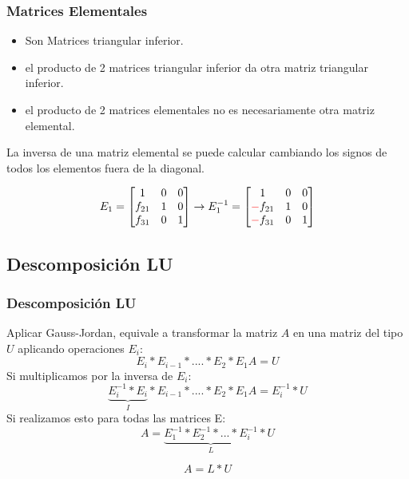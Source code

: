 \documentclass[xcolor=svgnames]{beamer} %
\theoremstyle{plain}
\theoremstyle{definition}
\begin{document}
\begin{frame}
\frametitle{Matrices Elementales}

\begin{itemize}
\item Son Matrices triangular inferior.
\item el producto de 2 matrices triangular inferior da otra matriz triangular inferior.
\item el producto de 2 matrices elementales no es necesariamente otra matriz elemental.
\end{itemize}
La inversa de una matriz elemental se puede calcular cambiando los signos de todos los elementos fuera de la diagonal.

$$ E_1 = \begin{bmatrix}
1 &0 & 0\\
f_{21}& 1 &0 \\
f_{31}& 0 &1 
\end{bmatrix} \rightarrow E_1^{-1} = \begin{bmatrix}
1 &0 & 0\\
{\color{red} -} f_{21}& 1 &0 \\
{\color{red} -} f_{31}& 0 &1 
\end{bmatrix}$$
\end{frame}

\subsection{Descomposición LU}
\begin{frame}
\frametitle{Descomposición LU}
Aplicar Gauss-Jordan, equivale a transformar la matriz $A$ en una matriz del tipo $U$ aplicando operaciones $E_i$:
$$ E_i * E_{i-1}* ....* E_2 * E_1 A = U $$
Si multiplicamos por la inversa de $E_i$:
$$ \underbrace{E_i^{-1} * E_i}_{I} * E_{i-1}* ....* E_2 * E_1 A = E_i^{-1} * U $$
Si realizamos esto para todas las matrices E:
$$ A = \underbrace{E_1^{-1} *E_2^{-1} *...*E_i^{-1}}_{L} * U$$

\begin{tcolorbox}
$$A = L * U $$
\end{tcolorbox}
\end{frame}
\end{document}
